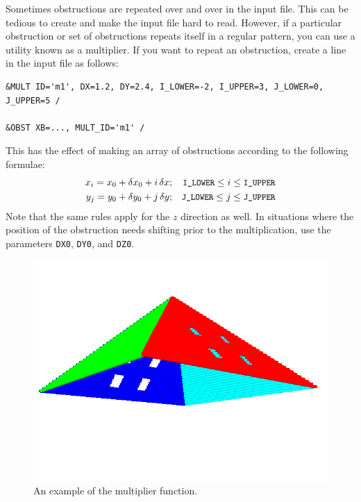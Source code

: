 \documentclass[11pt]{book}
\newcommand{\ct}{\tt\small}
\newcommand{\dx}{\delta x}
\newcommand{\dy}{\delta y}
\begin{document}
Sometimes obstructions are repeated over and over in the input file. This can be tedious to create and make the input file hard to read. However,
if a particular obstruction or set of obstructions repeats itself in a regular pattern, you can use a utility known as a multiplier. If you want to
repeat an obstruction, create a line in the input file as follows:

\footnotesize
\begin{verbatim}
&MULT ID='m1', DX=1.2, DY=2.4, I_LOWER=-2, I_UPPER=3, J_LOWER=0, J_UPPER=5 /

&OBST XB=..., MULT_ID='m1' /
\end{verbatim}
\normalsize

\noindent
This has the effect of making an array of obstructions according to the following formulae:
\begin{eqnarray*}  x_i = x_0 + \dx_0 + i \, \dx  &;& \hbox{\ct I\_LOWER} \le i \le \hbox{\ct I\_UPPER} \\
                   y_j = y_0 + \dy_0 + j \, \dy  &;& \hbox{\ct J\_LOWER} \le j \le \hbox{\ct J\_UPPER}
\end{eqnarray*}
Note that the same rules apply for the $z$ direction as well. In situations where the position of the obstruction needs shifting prior to the multiplication, use the
parameters {\ct DX0}, {\ct DY0}, and {\ct DZ0}.

\begin{figure}[t]
\includegraphics[width=\textwidth]{SCRIPT_FIGURES/pyramid}
\caption{An example of the multiplier function.}
\label{fig:mult}
\end{figure}
\end{document}
